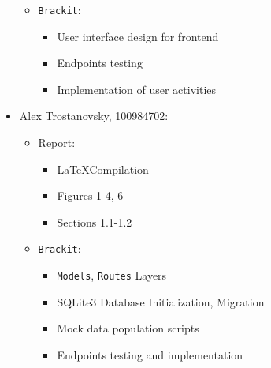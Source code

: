 \documentclass{article}
\begin{document}
\begin{itemize}
{\begin{itemize}
{                \begin{itemize}
                    \item{Section 2.2}
                    \item{Figure 5}
                \end{itemize}
            }
            \item{\texttt{Brackit}:
                \begin{itemize}
                    \item{User interface design for frontend}
                    \item{Endpoints testing}
                    \item{Implementation of user activities}
                \end{itemize}
            }
        \end{itemize}
    }
    \item{Alex Trostanovsky, 100984702: 
        \begin{itemize}
            \item{Report: 
                \begin{itemize}
                    \item{\LaTeX Compilation}
                    \item{Figures 1-4, 6}
                    \item{Sections 1.1-1.2}
                \end{itemize}
            }
            \item{\texttt{Brackit}: 
                \begin{itemize}
                    \item{\texttt{Models}, \texttt{Routes} Layers}
                    \item{SQLite3 Database Initialization, Migration}
                    \item{Mock data population scripts}
                    \item{Endpoints testing and implementation}
                \end{itemize}
            }    
        \end{itemize}
    }
    
\end{itemize}

\clearpage


\end{document}
